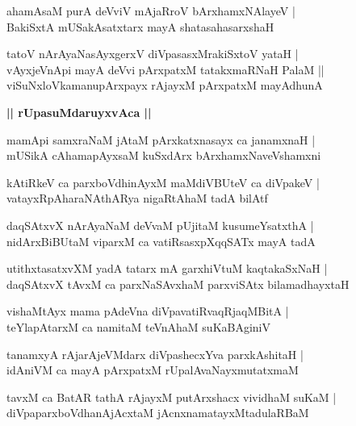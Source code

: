 \documentclass[twoside,12pt,openright]{book}
\newcounter{shloka}[chapter]
\def\uvaca#1{\centerline{{\large\textbf{#1}}}}
\begin{document}
\begin{shloka}%
ahamAsaM purA deVviV mAjaRroV bArxhamxNAlayeV |\\
BakiSxtA mUSakAsatxtarx mayA shatasahasarxshaH 
\end{shloka}

\begin{shloka}%
tatoV nArAyaNasAyxgerxV diVpasasxMrakiSxtoV yataH |\\
vAyxjeVnApi mayA deVvi pArxpatxM tatakxmaRNaH PalaM ||\\
viSuNxloVkamanupArxpayx rAjayxM pArxpatxM mayAdhunA 
\end{shloka}

\uvaca{|| rUpasuMdaruyxvAca ||}

\begin{shloka}%
mamApi samxraNaM jAtaM pArxkatxnasayx ca janamxnaH |\\
mUSikA cAhamapAyxsaM kuSxdArx bArxhamxNaveVshamxni
\end{shloka}

\begin{shloka}%
kAtiRkeV ca parxboVdhinAyxM maMdiVBUteV ca diVpakeV |\\
vatayxRpAharaNAthARya nigaRtAhaM tadA bilAtf
\end{shloka}

\begin{shloka}%
daqSAtxvX nArAyaNaM deVvaM pUjitaM kusumeYsatxthA |\\
nidArxBiBUtaM viparxM ca vatiRsasxpXqqSATx mayA tadA
\end{shloka}

\begin{shloka}%
utithxtasatxvXM yadA tatarx mA garxhiVtuM kaqtakaSxNaH |\\
daqSAtxvX tAvxM ca parxNaSAvxhaM parxviSAtx bilamadhayxtaH 
\end{shloka}

\begin{shloka}%
vishaMtAyx mama pAdeVna diVpavatiRvaqRjaqMBitA |\\
teYlapAtarxM ca namitaM teVnAhaM suKaBAginiV 
\end{shloka}

\begin{shloka}%
tanamxyA rAjarAjeVMdarx diVpashecxYva parxkAshitaH |\\
idAniVM ca mayA pArxpatxM rUpalAvaNayxmutatxmaM
\end{shloka}

\begin{shloka}%
tavxM ca BatAR tathA rAjayxM putArxshacx vividhaM suKaM |\\
diVpaparxboVdhanAjAcxtaM jAcnxnamatayxMtadulaRBaM 
\end{shloka}
\end{document}
